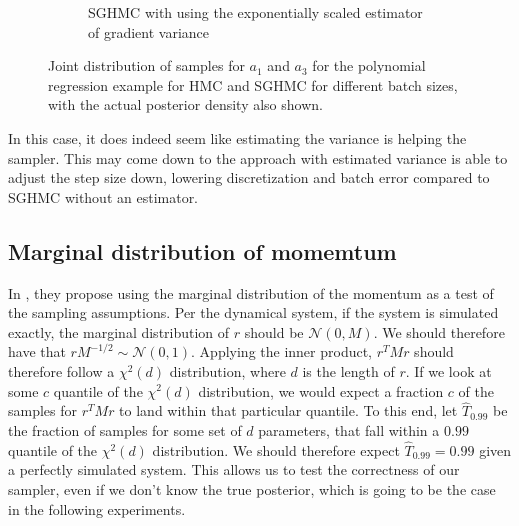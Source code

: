 \begin{figure}[htbp]
\begin{subfigure}[t]{0.4\textwidth}
        \caption{SGHMC with using the exponentially scaled estimator of gradient variance}
    \end{subfigure}
    \caption{Joint distribution of samples for $a_1$ and $a_3$ for the polynomial regression example for HMC and SGHMC for different batch sizes, with the actual posterior density also shown.}
    \label{fig:simualted_var_est_joint_comp}
\end{figure}
In this case, it does indeed seem like estimating the variance is helping the sampler.
This may come down to the approach with estimated variance is able to adjust the step size down, lowering discretization and batch error compared to SGHMC without an estimator. 

\subsection{Marginal distribution of momemtum}

In \cite{wenzel_how_2020}, they propose using the marginal distribution of the momentum as a test of the sampling assumptions. 
Per the dynamical system, if the system is simulated exactly, the marginal distribution of $r$ should be $\mathcal{N}(0, M)$. 
We should therefore have that $r M^{-1/2} \sim \mathcal{N}(0, 1)$. 
Applying the inner product, $r^T M r$ should therefore follow a $\chi^2(d)$ distribution, where $d$ is the length of $r$. 
If we look at some $c$ quantile of the $\chi^2(d)$ distribution, we would expect a fraction $c$ of the samples for $r^T M r$ to land within that particular quantile. 
To this end, let $\hat T_{0.99}$ be the fraction of samples for some set of $d$ parameters, that fall within a $0.99$ quantile of the $\chi^2(d)$ distribution. 
We should therefore expect $\hat T_{0.99}=0.99$ given a perfectly simulated system.
This allows us to test the correctness of our sampler, even if we don't know the true posterior, which is going to be the case in the following experiments.

